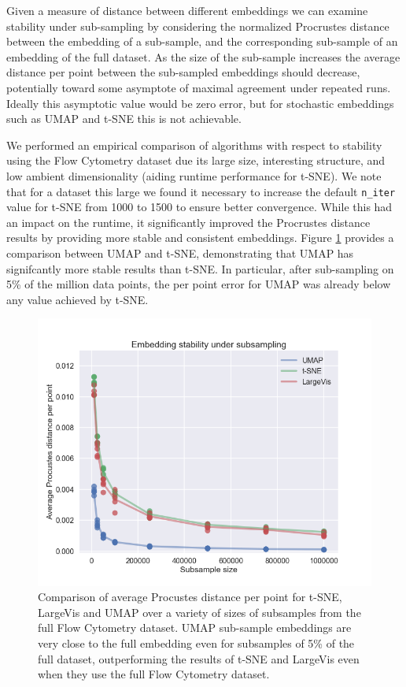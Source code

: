 \documentclass[12pt]{article}
\begin{document}
Given a measure of distance between different embeddings we can examine stability under sub-sampling by considering the normalized Procrustes distance between the embedding of a sub-sample, and the corresponding sub-sample of an embedding of the full dataset. As the size of the sub-sample increases the average distance per point between the sub-sampled embeddings should decrease, potentially toward some asymptote of maximal agreement under repeated runs. Ideally this asymptotic value would be zero error, but for stochastic embeddings such as UMAP and t-SNE this is not achievable.

We performed an empirical comparison of algorithms with respect to stability using the Flow Cytometry dataset due its large size, interesting structure, and low ambient dimensionality (aiding runtime performance for t-SNE). We note that for a dataset this large we found it necessary to increase the default \verb+n_iter+ value for t-SNE from 1000 to 1500 to ensure better convergence. While this had an impact on the runtime, it significantly improved the Procrustes distance results by providing more stable and consistent embeddings. Figure \ref{fig:procustes-results} provides a comparison between UMAP and t-SNE, demonstrating that UMAP has signifcantly more stable results than t-SNE. In particular, after sub-sampling on 5\% of the million data points, the per point error for UMAP was already below any value achieved by t-SNE. 

\begin{figure}
    \centering
    \includegraphics[width=\textwidth]{procrustes_distance.png}
    \caption{Comparison of average Procustes distance per point for t-SNE, LargeVis and UMAP over a variety of sizes of subsamples from the full  Flow Cytometry dataset. UMAP sub-sample embeddings are very close to the full embedding even for subsamples of 5\% of the full dataset, outperforming the results of t-SNE and LargeVis even when they use the full Flow Cytometry dataset.}
    \label{fig:procustes-results}
\end{figure}
\end{document}

